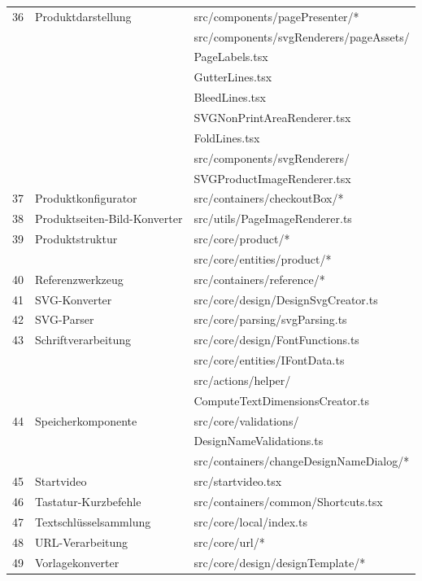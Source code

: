 \begin{longtable}{r@{\hspace{5mm}}lX}
    \hline
    36 & Produktdarstellung & src/components/pagePresenter/* \\
        & & src/components/svgRenderers/pageAssets/
        \\ & & \> PageLabels.tsx \\
           & & \> GutterLines.tsx \\
           & & \> BleedLines.tsx \\
           & & \> SVGNonPrintAreaRenderer.tsx \\
           & & \> FoldLines.tsx \\
           & & src/components/svgRenderers/ \\ & & \> SVGProductImageRenderer.tsx \\
    \hline
    37 & Produktkonfigurator & src/containers/checkoutBox/* \\
    \hline
    38 & Produktseiten-Bild-Konverter & src/utils/PageImageRenderer.ts \\
    \hline
    39 & Produktstruktur & src/core/product/* \\
        & & src/core/entities/product/* \\
    \hline
    40 & Referenzwerkzeug & src/containers/reference/* \\
    \hline
    41 & SVG-Konverter & src/core/design/DesignSvgCreator.ts \\
    \hline
    42 & SVG-Parser & src/core/parsing/svgParsing.ts \\
    \hline
    43 & Schriftverarbeitung & src/core/design/FontFunctions.ts \\
        & & src/core/entities/IFontData.ts \\
        & & src/actions/helper/ \\ & & \> ComputeTextDimensionsCreator.ts \\
    \hline
    44 & Speicherkomponente & src/core/validations/ \\ & & \> DesignNameValidations.ts \\
        & & src/containers/changeDesignNameDialog/* \\
    \hline
    45 & Startvideo & src/startvideo.tsx \\
    \hline
    46 & Tastatur-Kurzbefehle & src/containers/common/Shortcuts.tsx \\
    \hline
    47 & Textschlüsselsammlung & src/core/local/index.ts \\
    \hline
    48 & URL-Verarbeitung & src/core/url/* \\
    \hline
    49 & Vorlagekonverter & src/core/design/designTemplate/* \\

\end{longtable}
